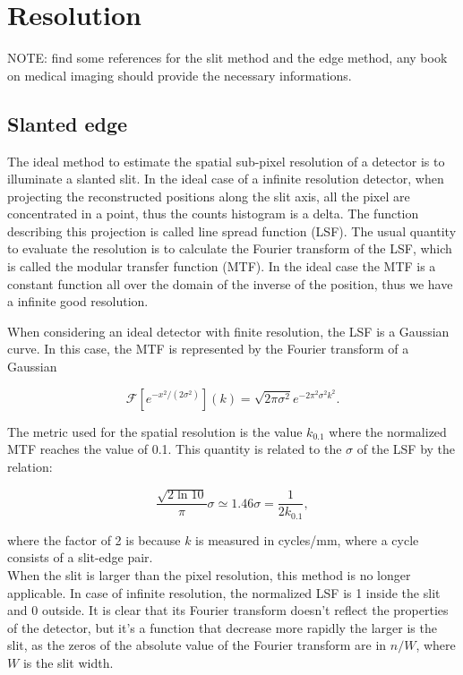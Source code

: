 \chapter{Resolution}
\label{chap:resolution}
NOTE: find some references for the slit method and the edge method, any book on medical imaging should provide the necessary informations.


\section{Slanted edge}
The ideal method to estimate the spatial sub-pixel resolution of a detector is to illuminate a slanted slit. In the ideal case of a infinite resolution detector, when projecting the reconstructed positions along the slit axis, all the pixel are concentrated in a point, thus the counts histogram is a delta. The function describing this projection is called line spread function (LSF). The usual quantity to evaluate the resolution is to calculate the Fourier transform of the LSF, which is called the modular transfer function (MTF). In the ideal case the MTF is a constant function all over the domain of the inverse of the position, thus we have a infinite good resolution.

When considering an ideal detector with finite resolution, the LSF is a Gaussian curve. In this case, the MTF is represented by the Fourier transform of a Gaussian

\begin{equation}
\mathcal{F}[e^{-x^2/(2\sigma^2)}](k) = \sqrt{2\pi \sigma ^2} e^{-2\pi^2\sigma^2 k^2}.
\end{equation}


The metric used for the spatial resolution is the value $k_{0.1}$ where the normalized MTF reaches the value of 0.1. This quantity is related to the $\sigma$ of the LSF by the relation:

\begin{equation}
\frac{\sqrt{2 \ln{10}}}{\pi} \sigma \simeq 1.46 \sigma = \frac{1}{2 k_{0.1}},
\end{equation}

where the factor of 2 is because $k$ is measured in cycles/mm, where a cycle consists of a slit-edge pair.\\

When the slit is larger than the pixel resolution, this method is no longer applicable. In case of infinite resolution, the normalized LSF is 1 inside the slit and 0 outside. It is clear that its Fourier transform doesn't reflect the properties of the detector, but it's a function that decrease more rapidly the larger is the slit, as the zeros of the absolute value of the Fourier transform are in $n/W$, where $W$ is the slit width.

